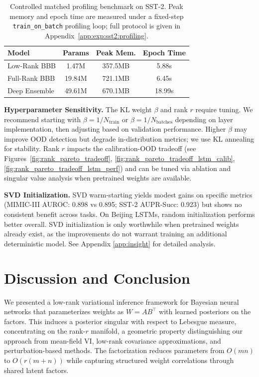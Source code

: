 \documentclass{article}
\theoremstyle{plain}
\theoremstyle{definition}
\theoremstyle{remark}
\begin{document}
\begin{table}[!ht]
\centering
\caption{Controlled matched profiling benchmark on SST-2. Peak memory and epoch time are measured under a fixed-step \texttt{train\_on\_batch} profiling loop; full protocol is given in Appendix~\ref{app:exp:sst2:profiling}.}
\label{tab:sst2_profile_main}
\small
\begin{tabular}{lccc}
\toprule
\textbf{Model} & \textbf{Params} & \textbf{Peak Mem.} & \textbf{Epoch Time} \\
\midrule
Low-Rank BBB & 1.47M & 357.5MB & 5.88s \\
Full-Rank BBB & 19.84M & 721.1MB & 6.45s \\
Deep Ensemble & 49.61M & 670.1MB & 18.99s \\
\bottomrule
\end{tabular}
\end{table}



\textbf{Hyperparameter Sensitivity.}
The KL weight $\beta$ and rank $r$ require tuning. We recommend starting with $\beta = 1/N_{\text{train}}$ or $\beta = 1/N_{\text{batches}}$ depending on layer implementation, then adjusting based on validation performance. Higher $\beta$ may improve OOD detection but degrade in-distribution metrics; we use KL annealing for stability. Rank $r$ impacts the calibration-OOD tradeoff (see Figures~\ref{fig:rank_pareto_tradeoff}, \ref{fig:rank_pareto_tradeoff_lstm_calib}, \ref{fig:rank_pareto_tradeoff_lstm_perf}) and can be tuned via ablation and singular value analysis when pretrained weights are available.

\textbf{SVD Initialization.}
SVD warm-starting yields modest gains on specific metrics (MIMIC-III AUROC: 0.898 vs 0.895; SST-2 AUPR-Succ: 0.923) but shows no consistent benefit across tasks. On Beijing LSTMs, random initialization performs better overall. SVD initialization is only worthwhile when pretrained weights already exist, as the improvements do not warrant training an additional deterministic model. See Appendix \ref{app:insight} for detailed analysis. 


\section{Discussion and Conclusion}
We presented a low-rank variational inference framework for Bayesian neural networks that parameterizes weights as $W = AB^\top$ with learned posteriors on the factors. This induces a posterior singular with respect to Lebesgue measure, concentrating on the rank-$r$ manifold, a geometric property distinguishing our approach from mean-field VI, low-rank covariance approximations, and perturbation-based methods. The factorization reduces parameters from $O(mn)$ to $O(r(m+n))$ while capturing structured weight correlations through shared latent factors.
\end{document}
